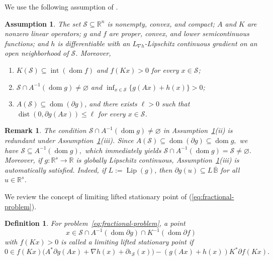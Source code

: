 \documentclass[11pt]{article}
\numberwithin{equation}{section}
\newtheorem{assumption}[theorem]{Assumption}
\newtheorem{remark}[theorem]{Remark}
\newtheorem{definition}[theorem]{Definition}
\newcommand{\R}{\mathbb{R}}
\newcommand{\Lip}{\operatorname{Lip}}
\newcommand{\dist}{\operatorname{dist}}
\DeclareMathOperator{\dom}{dom}
\begin{document}
We use the following  assumption of \cite[Assumption~3.1]{BotLiTao2025}.
\begin{assumption}\label{ass:standing}
The set \(\mathcal S\subseteq\mathbb R^n\) is nonempty, convex, and compact;
\(A\) and \(K\) are nonzero linear operators; \(g\) and \(f\) are proper,
convex, and lower semicontinuous functions; and \(h\) is differentiable with an
\(L_{\nabla h}\)-Lipschitz continuous gradient on an open neighborhood of
\(\mathcal S\). Moreover,
\begin{enumerate}[label=\textup{(\roman*)}]
    \item \(K(\mathcal S)\subseteq\operatorname{int}(\dom f)\) and
          \(f(Kx)>0\) for every \(x\in\mathcal S\);
    \item \(\mathcal S\cap A^{-1}(\dom g)\neq\varnothing\) and
          \(\inf_{x\in\mathcal S}\{g(Ax)+h(x)\}>0\);
    \item \(A(\mathcal S)\subseteq\dom(\partial g)\), and there exists
          \(\ell>0\) such that
          \(\dist(0,\partial g(Ax))\le\ell\) for every
          \(x\in\mathcal S\).
\end{enumerate}
\end{assumption}
\begin{remark}
The condition
$
\mathcal S\cap A^{-1}(\dom g)\!\neq\!\varnothing
$ in Assumption~\ref{ass:standing}(ii)
is redundant under Assumption~\ref{ass:standing}(iii). Since
$
A(\mathcal S)\subseteq\dom(\partial g)\subseteq\dom g,
$
we have
$
\mathcal S\subseteq A^{-1}(\dom g),
$
which immediately yields
$
\mathcal S\cap A^{-1}(\dom g)=\mathcal S\neq\varnothing.
$
Moreover, if \(g:\R^s\rightarrow\R\) is globally Lipschitz continuous,
Assumption~\ref{ass:standing}(iii) is automatically satisfied. Indeed, if
\(L:=\Lip(g)\), then
$\partial g(u)\subseteq L\,\overline{\mathbb B}$ for all $u\in\R^s$.
\end{remark}
We review the concept of limiting  lifted stationary point of (\ref{eq:fractional-problem}).

\begin{definition}\label{def:limiting-lifted-stationarity}
For problem~\eqref{eq:fractional-problem}, a point
\[
x\in\mathcal S\cap A^{-1}(\dom\partial g)
\cap K^{-1}(\dom\partial f)
\]
with \(f(Kx)>0\) is called a \emph{limiting lifted stationary point} if
\[
0\in
f(Kx)
\bigl(
A^*\partial g(Ax)+\nabla h(x)+\partial\iota_{\mathcal S}(x)
\bigr)
-
(g(Ax)+h(x))K^*\partial f(Kx).
\]
\end{definition}
\end{document}
